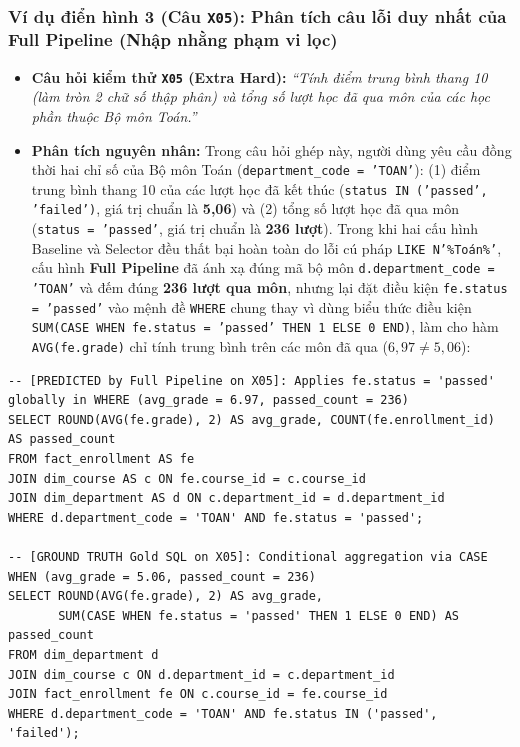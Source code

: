 \documentclass[12pt,a4paper]{report}
\begin{document}
\subsubsection{Ví dụ điển hình 3 (Câu \texttt{X05}): Phân tích câu lỗi duy nhất của Full Pipeline (Nhập nhằng phạm vi lọc)}
\begin{itemize}
    \item \textbf{Câu hỏi kiểm thử \texttt{X05} (Extra Hard):} \textit{``Tính điểm trung bình thang 10 (làm tròn 2 chữ số thập phân) và tổng số lượt học đã qua môn của các học phần thuộc Bộ môn Toán.''}
    \item \textbf{Phân tích nguyên nhân:} Trong câu hỏi ghép này, người dùng yêu cầu đồng thời hai chỉ số của Bộ môn Toán (\texttt{department\_code = 'TOAN'}): (1) điểm trung bình thang 10 của các lượt học đã kết thúc (\texttt{status IN ('passed', 'failed')}, giá trị chuẩn là \textbf{5,06}) và (2) tổng số lượt học đã qua môn (\texttt{status = 'passed'}, giá trị chuẩn là \textbf{236 lượt}). Trong khi hai cấu hình Baseline và Selector đều thất bại hoàn toàn do lỗi cú pháp \texttt{LIKE N'\%Toán\%'}, cấu hình \textbf{Full Pipeline} đã ánh xạ đúng mã bộ môn \texttt{d.department\_code = 'TOAN'} và đếm đúng \textbf{236 lượt qua môn}, nhưng lại đặt điều kiện \texttt{fe.status = 'passed'} vào mệnh đề \texttt{WHERE} chung thay vì dùng biểu thức điều kiện \texttt{SUM(CASE WHEN fe.status = 'passed' THEN 1 ELSE 0 END)}, làm cho hàm \texttt{AVG(fe.grade)} chỉ tính trung bình trên các môn đã qua ($6{,}97 \neq 5{,}06$):
\end{itemize}
\begin{lstlisting}[style=sqlstyle]
-- [PREDICTED by Full Pipeline on X05]: Applies fe.status = 'passed' globally in WHERE (avg_grade = 6.97, passed_count = 236)
SELECT ROUND(AVG(fe.grade), 2) AS avg_grade, COUNT(fe.enrollment_id) AS passed_count
FROM fact_enrollment AS fe
JOIN dim_course AS c ON fe.course_id = c.course_id
JOIN dim_department AS d ON c.department_id = d.department_id
WHERE d.department_code = 'TOAN' AND fe.status = 'passed';

-- [GROUND TRUTH Gold SQL on X05]: Conditional aggregation via CASE WHEN (avg_grade = 5.06, passed_count = 236)
SELECT ROUND(AVG(fe.grade), 2) AS avg_grade,
       SUM(CASE WHEN fe.status = 'passed' THEN 1 ELSE 0 END) AS passed_count
FROM dim_department d
JOIN dim_course c ON d.department_id = c.department_id
JOIN fact_enrollment fe ON c.course_id = fe.course_id
WHERE d.department_code = 'TOAN' AND fe.status IN ('passed', 'failed');
\end{lstlisting}
\end{document}
